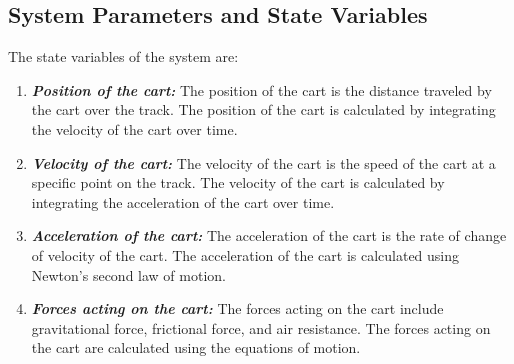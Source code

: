 \documentclass{article}
\begin{document}
    \subsection{System Parameters and State Variables}
    The state variables of the system are: \begin{enumerate} \item \textbf{\textit{Position
    of the cart:}} The position of the cart is the distance traveled by the cart
    over the track. The position of the cart is calculated by integrating the velocity
    of the cart over time.

    \item \textbf{\textit{Velocity of the cart:}} The velocity of the cart is
    the speed of the cart at a specific point on the track. The velocity of the cart
    is calculated by integrating the acceleration of the cart over time.

    \item \textbf{\textit{Acceleration of the cart:}} The acceleration of the
    cart is the rate of change of velocity of the cart. The acceleration of the cart
    is calculated using Newton's second law of motion.

    \item \textbf{\textit{Forces acting on the cart:}} The forces acting on the
    cart include gravitational force, frictional force, and air resistance. The forces
    acting on the cart are calculated using the equations of motion.
    \end{enumerate}
\end{document}
